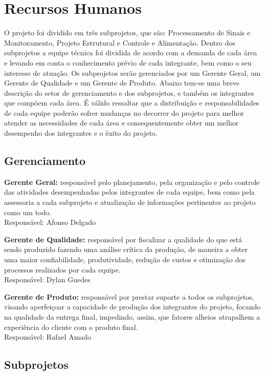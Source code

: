 \section{Recursos Humanos}

O projeto foi dividido em três subprojetos, que são: Processamento de Sinais e Monitoramento,
Projeto Estrutural e Controle e Alimentação. Dentro dos subprojetos a equipe
técnica foi dividida de acordo com a demanda de cada área e levando em conta o
conhecimento prévio de cada integrante, bem como o seu interesse de atuação. Os
subprojetos serão gerenciados por um Gerente Geral, um Gerente de Qualidade e
um Gerente de Produto.
Abaixo tem-se uma breve descrição do setor de gerenciamento e dos subprojetos,
e também os integrantes que compõem cada área. É válido ressaltar que a
distribuição e responsabilidades de cada equipe poderão sofrer mudanças no
decorrer do projeto para melhor atender as necessidades de cada área e
consequentemente obter um melhor desempenho dos integrantes e o êxito do projeto.

\subsection{Gerenciamento}

\textbf{Gerente Geral:} responsável pelo planejamento, pela organização e pelo controle das atividades desempenhadas pelos integrantes de cada equipe, bem como pela assessoria a cada subprojeto e atualização de informações pertinentes ao projeto como um todo.
\\Responsável: Afonso Delgado

\textbf{Gerente de Qualidade:} responsável por fiscalizar a qualidade do que está sendo produzido fazendo uma análise crítica da produção, de maneira a obter uma maior confiabilidade, produtividade, redução de custos e otimização dos processos realizados por cada equipe.
\\Responsável: Dylan Guedes

\textbf{Gerente de Produto:} responsável por prestar suporte a todos os subprojetos, visando aperfeiçoar a capacidade de produção dos integrantes do projeto, focando na qualidade da entrega final, impedindo, assim,  que fatores alheios atrapalhem a experiência do cliente com o produto final.
\\Responsável: Rafael Amado

\subsection{Subprojetos}

